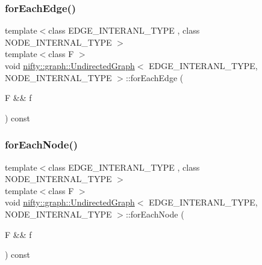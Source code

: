 \mbox{\label{classnifty_1_1graph_1_1UndirectedGraph_a6e9c1a754ba6d85b12a44e49f8f0a343}} 
\subsubsection{\texorpdfstring{for\+Each\+Edge()}{forEachEdge()}}
{\footnotesize\ttfamily template$<$class E\+D\+G\+E\+\_\+\+I\+N\+T\+E\+R\+A\+N\+L\+\_\+\+T\+Y\+PE , class N\+O\+D\+E\+\_\+\+I\+N\+T\+E\+R\+N\+A\+L\+\_\+\+T\+Y\+PE $>$ \\
template$<$class F $>$ \\
void \hyperlink{classnifty_1_1graph_1_1UndirectedGraph}{nifty\+::graph\+::\+Undirected\+Graph}$<$ E\+D\+G\+E\+\_\+\+I\+N\+T\+E\+R\+A\+N\+L\+\_\+\+T\+Y\+PE, N\+O\+D\+E\+\_\+\+I\+N\+T\+E\+R\+N\+A\+L\+\_\+\+T\+Y\+PE $>$\+::for\+Each\+Edge (\begin{DoxyParamCaption}\item[{F \&\&}]{f }\end{DoxyParamCaption}) const}

\mbox{\label{classnifty_1_1graph_1_1UndirectedGraph_a2bd33f944c05eeea7295047378902cb6}} 
\subsubsection{\texorpdfstring{for\+Each\+Node()}{forEachNode()}}
{\footnotesize\ttfamily template$<$class E\+D\+G\+E\+\_\+\+I\+N\+T\+E\+R\+A\+N\+L\+\_\+\+T\+Y\+PE , class N\+O\+D\+E\+\_\+\+I\+N\+T\+E\+R\+N\+A\+L\+\_\+\+T\+Y\+PE $>$ \\
template$<$class F $>$ \\
void \hyperlink{classnifty_1_1graph_1_1UndirectedGraph}{nifty\+::graph\+::\+Undirected\+Graph}$<$ E\+D\+G\+E\+\_\+\+I\+N\+T\+E\+R\+A\+N\+L\+\_\+\+T\+Y\+PE, N\+O\+D\+E\+\_\+\+I\+N\+T\+E\+R\+N\+A\+L\+\_\+\+T\+Y\+PE $>$\+::for\+Each\+Node (\begin{DoxyParamCaption}\item[{F \&\&}]{f }\end{DoxyParamCaption}) const}

